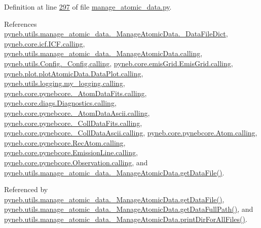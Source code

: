 Definition at line \hyperlink{manage__atomic__data_8py_source_l00297}{297} of file \hyperlink{manage__atomic__data_8py_source}{manage\+\_\+atomic\+\_\+data.\+py}.



References \hyperlink{manage__atomic__data_8py_source_l00078}{pyneb.\+utils.\+manage\+\_\+atomic\+\_\+data.\+\_\+\+Manage\+Atomic\+Data.\+\_\+\+Data\+File\+Dict}, \hyperlink{icf_8py_source_l00016}{pyneb.\+core.\+icf.\+I\+C\+F.\+calling}, \hyperlink{manage__atomic__data_8py_source_l00018}{pyneb.\+utils.\+manage\+\_\+atomic\+\_\+data.\+\_\+\+Manage\+Atomic\+Data.\+calling}, \hyperlink{_config_8py_source_l00032}{pyneb.\+utils.\+Config.\+\_\+\+Config.\+calling}, \hyperlink{emis_grid_8py_source_l00041}{pyneb.\+core.\+emis\+Grid.\+Emis\+Grid.\+calling}, \hyperlink{plot_atomic_data_8py_source_l00042}{pyneb.\+plot.\+plot\+Atomic\+Data.\+Data\+Plot.\+calling}, \hyperlink{logging_8py_source_l00044}{pyneb.\+utils.\+logging.\+my\+\_\+logging.\+calling}, \hyperlink{pynebcore_8py_source_l00090}{pyneb.\+core.\+pynebcore.\+\_\+\+Atom\+Data\+Fits.\+calling}, \hyperlink{diags_8py_source_l00169}{pyneb.\+core.\+diags.\+Diagnostics.\+calling}, \hyperlink{pynebcore_8py_source_l00311}{pyneb.\+core.\+pynebcore.\+\_\+\+Atom\+Data\+Ascii.\+calling}, \hyperlink{pynebcore_8py_source_l00568}{pyneb.\+core.\+pynebcore.\+\_\+\+Coll\+Data\+Fits.\+calling}, \hyperlink{pynebcore_8py_source_l00918}{pyneb.\+core.\+pynebcore.\+\_\+\+Coll\+Data\+Ascii.\+calling}, \hyperlink{pynebcore_8py_source_l01175}{pyneb.\+core.\+pynebcore.\+Atom.\+calling}, \hyperlink{pynebcore_8py_source_l02572}{pyneb.\+core.\+pynebcore.\+Rec\+Atom.\+calling}, \hyperlink{pynebcore_8py_source_l03263}{pyneb.\+core.\+pynebcore.\+Emission\+Line.\+calling}, \hyperlink{pynebcore_8py_source_l03419}{pyneb.\+core.\+pynebcore.\+Observation.\+calling}, and \hyperlink{manage__atomic__data_8py_source_l00297}{pyneb.\+utils.\+manage\+\_\+atomic\+\_\+data.\+\_\+\+Manage\+Atomic\+Data.\+get\+Data\+File()}.



Referenced by \hyperlink{manage__atomic__data_8py_source_l00297}{pyneb.\+utils.\+manage\+\_\+atomic\+\_\+data.\+\_\+\+Manage\+Atomic\+Data.\+get\+Data\+File()}, \hyperlink{manage__atomic__data_8py_source_l00339}{pyneb.\+utils.\+manage\+\_\+atomic\+\_\+data.\+\_\+\+Manage\+Atomic\+Data.\+get\+Data\+Full\+Path()}, and \hyperlink{manage__atomic__data_8py_source_l00172}{pyneb.\+utils.\+manage\+\_\+atomic\+\_\+data.\+\_\+\+Manage\+Atomic\+Data.\+print\+Dir\+For\+All\+Files()}.


